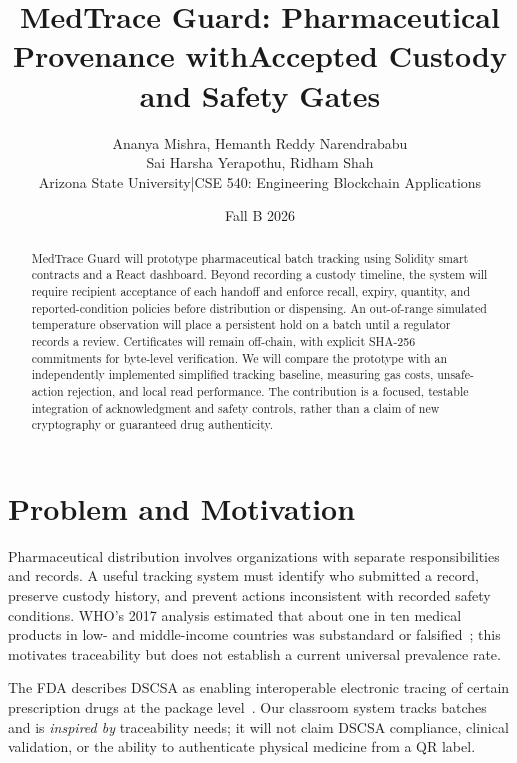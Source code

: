 \documentclass[10pt,twocolumn,letterpaper]{article}
\title{\vspace{-1.5em}\Large\bfseries MedTrace Guard: Pharmaceutical Provenance with\newline Accepted Custody and Safety Gates}
\author{\normalsize Ananya Mishra, Hemanth Reddy Narendrababu\\\normalsize Sai Harsha Yerapothu, Ridham Shah\\\small Arizona State University\quad |\quad CSE 540: Engineering Blockchain Applications}
\date{\vspace{-1em}Fall B 2026\vspace{-1em}}
\begin{document}
\maketitle
\begin{abstract}
MedTrace Guard will prototype pharmaceutical batch tracking using Solidity smart contracts and a React dashboard. Beyond recording a custody timeline, the system will require recipient acceptance of each handoff and enforce recall, expiry, quantity, and reported-condition policies before distribution or dispensing. An out-of-range simulated temperature observation will place a persistent hold on a batch until a regulator records a review. Certificates will remain off-chain, with explicit SHA-256 commitments for byte-level verification. We will compare the prototype with an independently implemented simplified tracking baseline, measuring gas costs, unsafe-action rejection, and local read performance. The contribution is a focused, testable integration of acknowledgment and safety controls, rather than a claim of new cryptography or guaranteed drug authenticity.
\end{abstract}

\section{Problem and Motivation}
Pharmaceutical distribution involves organizations with separate responsibilities and records. A useful tracking system must identify who submitted a record, preserve custody history, and prevent actions inconsistent with recorded safety conditions. WHO's 2017 analysis estimated that about one in ten medical products in low- and middle-income countries was substandard or falsified~\cite{who}; this motivates traceability but does not establish a current universal prevalence rate.

The FDA describes DSCSA as enabling interoperable electronic tracing of certain prescription drugs at the package level~\cite{fda}. Our classroom system tracks batches and is \emph{inspired by} traceability needs; it will not claim DSCSA compliance, clinical validation, or the ability to authenticate physical medicine from a QR label.
\end{document}
